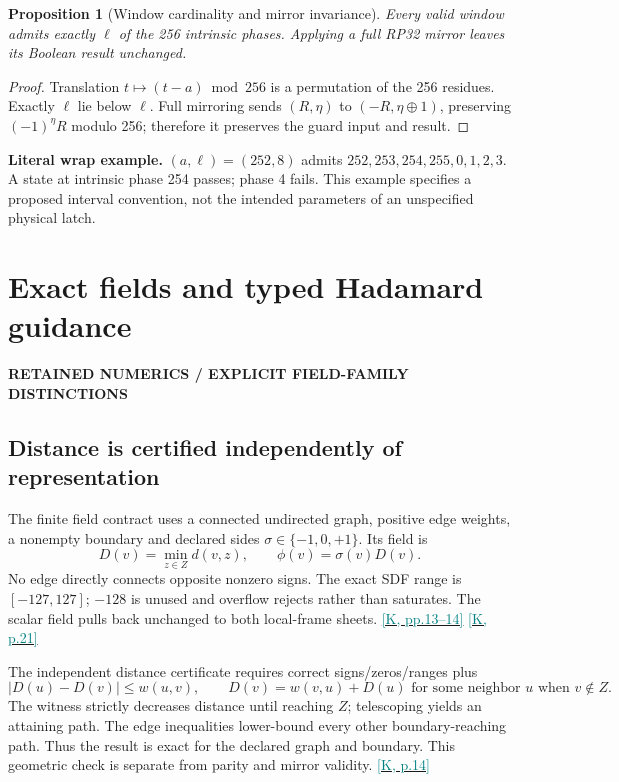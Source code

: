 \documentclass[11pt,a4paper]{article}
\newcommand{\kref}[1]{\hyperlink{baseline.#1}{\textcolor{teal}{[K, p.#1]}}}
\newcommand{\krange}[2]{\hyperlink{baseline.#1}{\textcolor{teal}{[K, pp.#1--#2]}}}
\newcommand{\status}[1]{{\sffamily\bfseries\scriptsize\color{teal}#1}\par}
\newcommand{\sectionstart}[1]{\par\addvspace{18pt}\Needspace{12\baselineskip}\section{#1}}
\theoremstyle{lpstyle}
\newtheorem{theorem}{Proposition}[section]
\newcommand{\sbit}[1]{(-1)^{#1}}
\begin{document}
\begin{theorem}[Window cardinality and mirror invariance]
Every valid window admits exactly $\ell$ of the 256 intrinsic phases. Applying a full RP32 mirror leaves its Boolean result unchanged.
\end{theorem}
\begin{proof}
Translation $t\mapsto(t-a)\bmod256$ is a permutation of the 256 residues. Exactly $\ell$ lie below $\ell$. Full mirroring sends $(R,\eta)$ to $(-R,\eta\oplus1)$, preserving $\sbit{\eta}R$ modulo 256; therefore it preserves the guard input and result.
\end{proof}

\textbf{Literal wrap example.} $(a,\ell)=(252,8)$ admits $252,253,254,255,0,1,2,3$. A state at intrinsic phase 254 passes; phase 4 fails. This example specifies a proposed interval convention, not the intended parameters of an unspecified physical latch.

\sectionstart{Exact fields and typed Hadamard guidance}
\status{RETAINED NUMERICS / EXPLICIT FIELD-FAMILY DISTINCTIONS}
\subsection{Distance is certified independently of representation}
The finite field contract uses a connected undirected graph, positive edge weights, a nonempty boundary and declared sides $\sigma\in\{-1,0,+1\}$. Its field is
\[
D(v)=\min_{z\in Z}d(v,z),\qquad \phi(v)=\sigma(v)D(v).
\]
No edge directly connects opposite nonzero signs. The exact SDF range is $[-127,127]$; $-128$ is unused and overflow rejects rather than saturates. The scalar field pulls back unchanged to both local-frame sheets. \krange{13}{14} \kref{21}

The independent distance certificate requires correct signs/zeros/ranges plus
\[
|D(u)-D(v)|\le w(u,v),\qquad
D(v)=w(v,u)+D(u)\text{ for some neighbor }u\text{ when }v\notin Z.
\]
The witness strictly decreases distance until reaching $Z$; telescoping yields an attaining path. The edge inequalities lower-bound every other boundary-reaching path. Thus the result is exact for the declared graph and boundary. This geometric check is separate from parity and mirror validity. \kref{14}
\end{document}
